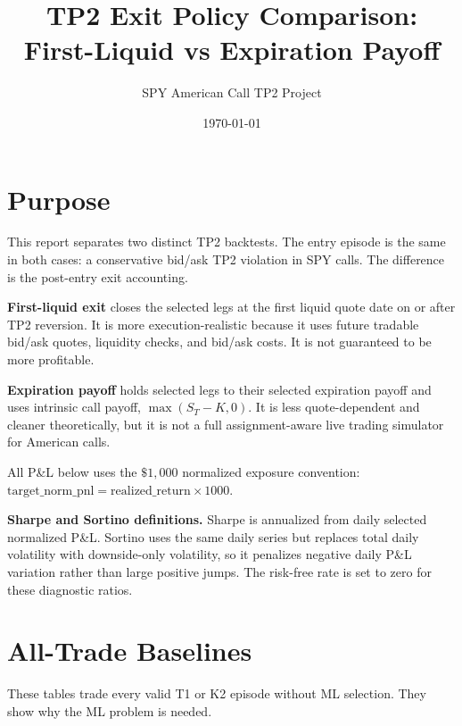 \documentclass[11pt]{article}
\title{TP2 Exit Policy Comparison: First-Liquid vs Expiration Payoff}
\author{SPY American Call TP2 Project}
\date{\today}
\begin{document}
\maketitle

\section{Purpose}
This report separates two distinct TP2 backtests. The entry episode is the same in both cases: a conservative bid/ask TP2 violation in SPY calls. The difference is the post-entry exit accounting.

\textbf{First-liquid exit} closes the selected legs at the first liquid quote date on or after TP2 reversion. It is more execution-realistic because it uses future tradable bid/ask quotes, liquidity checks, and bid/ask costs. It is not guaranteed to be more profitable.

\textbf{Expiration payoff} holds selected legs to their selected expiration payoff and uses intrinsic call payoff, \(\max(S_T-K,0)\). It is less quote-dependent and cleaner theoretically, but it is not a full assignment-aware live trading simulator for American calls.

All P\&L below uses the \(\$1{,}000\) normalized exposure convention: \(\mathrm{target\_norm\_pnl}=\mathrm{realized\_return}\times1000\).

\textbf{Sharpe and Sortino definitions.} Sharpe is annualized from daily selected normalized P\&L. Sortino uses the same daily series but replaces total daily volatility with downside-only volatility, so it penalizes negative daily P\&L variation rather than large positive jumps. The risk-free rate is set to zero for these diagnostic ratios.

\section{All-Trade Baselines}
These tables trade every valid T1 or K2 episode without ML selection. They show why the ML problem is needed.
\end{document}
